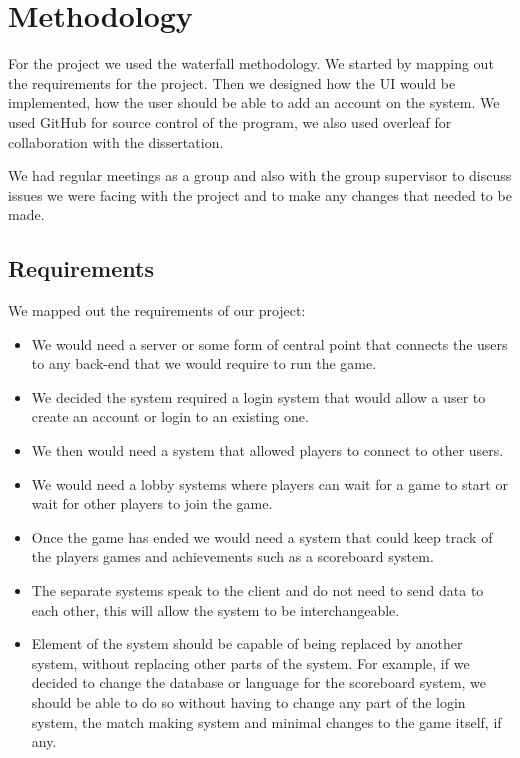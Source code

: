 
\chapter{Methodology}

For the project we used the waterfall methodology. We started by mapping out the requirements for the project. Then we designed how the UI would be implemented, how the user should be able to add an account on the system.  We used GitHub for source control of the program, we also used overleaf for collaboration with the dissertation.

We had regular meetings as a group and also with the group supervisor to discuss issues we were facing with the project and to make any changes that needed to be made.

\section{Requirements}

We mapped out the requirements of our project:
\begin{itemize}
\item We would need a server or some form of central point that connects the users to any back-end that we would require to run the game.
\item We decided the system required a login system that would allow a user to create an account or login to an existing one.
\item We then would need a system that allowed players to connect to other users.
\item We would need a lobby systems where players can wait for a game to start or wait for other players to join the game.
\item Once the game has ended we would need a system that could keep track of the players games and achievements such as a scoreboard system.
\item The separate systems speak to the client and do not need to send data to each other, this will allow the system to be interchangeable.
\item Element of the system should be capable of being replaced by another system, without replacing other parts of the system. For example, if we decided to change the database or language for the scoreboard system, we should be able to do so without having to change any part of the login system, the match making system and minimal changes to the game itself, if any.
\end{itemize}


